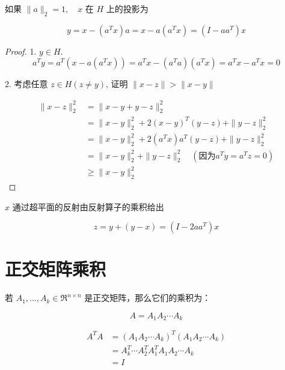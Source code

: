 \begin{theorem}
    如果 $ \|a\|_{2}=1, \quad x $ 在 $ H $ 上的投影为

    \begin{equation} y=x-\left(a^{T} x\right) a=x-a\left(a^{T} x\right)=\left(I-a a^{T}\right) x \end{equation}
\end{theorem}

\begin{proof}
1. $ y \in H $.
\begin{equation}
a^{T} y=a^{T}\left(x-a\left(a^{T} x\right)\right)=a^{T} x-\left(a^{T} a\right)\left(a^{T} x\right)=a^{T} x-a^{T} x=0
\end{equation}

2. 考虑任意 $ z \in H(z \neq y) $, 证明 $ \|x-z\|>\|x-y\| $

\begin{equation} \begin{aligned}\|x-z\|_{2}^{2} &=\|x-y+y-z\|_{2}^{2} 
    \\ &=\|x-y\|_{2}^{2}+2(x-y)^{T}(y-z)+\|y-z\|_{2}^{2} 
    \\ &=\|x-y\|_{2}^{2}+2\left(a^{T} x\right) a^{T}(y-z)+\|y-z\|_{2}^{2}
    \\ &=\|x-y\|_{2}^{2}+\|y-z\|_{2}^{2} \quad (因为  a^{T} y=a^{T} z = 0)
    \\ &\ge \|x-y\|_{2}^{2}
\end{aligned} \end{equation}

\end{proof}

\begin{corollary}
    $ x $ 通过超平面的反射由反射算子的乘积给出

    \begin{equation} z=y+(y-x)=\left(I-2 a a^{T}\right) x \end{equation}
\end{corollary}

\section{正交矩阵乘积}

若 $ A_{1}, \ldots, A_{k} \in \mathfrak{R}^{n \times n} $ 是正交矩阵，那么它们的乘积为：

\begin{equation} A=A_{1} A_{2} \cdots A_{k} \end{equation}

\begin{corollary}[正交矩阵乘积的正交性]

\begin{equation}\begin{aligned}
    A^{T} A&=\left(A_{1} A_{2} \cdots A_{k}\right)^{T}\left(A_{1} A_{2} \cdots A_{k}\right)\\
    &=A_{k}^{T} \cdots A_{2}^{T} A_{1}^{T} A_{1} A_{2} \cdots A_{k}\\
    &=I
\end{aligned}\end{equation}

\end{corollary}


